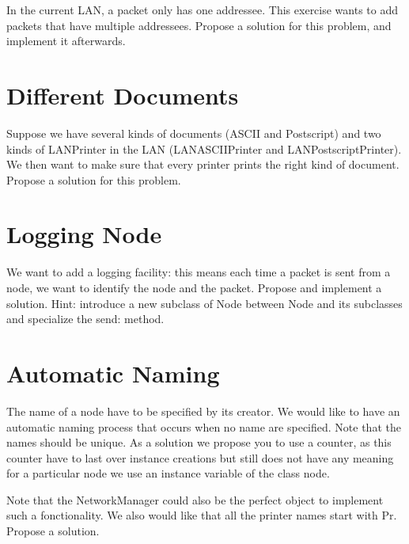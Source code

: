 In the current LAN, a packet only has one addressee. This exercise 
wants to add packets that have multiple addressees. Propose a 
solution for this problem, and implement it afterwards.



\section{Different Documents}
Suppose we have several kinds of documents (ASCII and Postscript) 
and two kinds of LANPrinter in the LAN (LANASCIIPrinter and LANPostscriptPrinter). 
We then want to make sure that every printer prints the right 
kind of document. Propose a solution for this problem.



\section{Logging Node}

We want to add a logging facility: this means each time a packet 
is sent from a node, we want to identify the node and the packet. 
Propose and implement a solution. Hint: introduce a new subclass 
of Node between Node and its subclasses and specialize the send: 
method. 

\section{Automatic Naming }


The name of a node have to be specified by its creator. We would 
like to have an automatic naming process that occurs when no 
name are specified. Note that the names should be unique. As 
a solution we propose you to use a counter, as this counter have 
to last over instance creations but still does not have any meaning 
for a particular node we use an instance variable of the class 
node.

Note that the NetworkManager could also be the perfect object 
to implement such a fonctionality.
We also would like that all the printer names start with Pr. 
Propose a solution. 


\ifx\wholebook\relax\else\fi